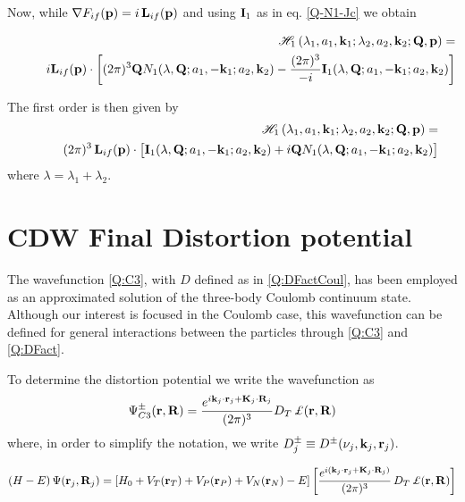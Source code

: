   \noindent
Now, while $\nabla F_{if} ({\mathbf{p}}) = i \, \mathbf{L}_{if}(\mathbf{p})$ and
using $\mathbf{I}_{1}$ as in eq. \ref{Q-N1-Jc} we obtain

\begin{eqnarray*}
&&\mathcal{H}_{1}\left( \lambda_{1},a_{1},\vect{k}_{1} ; \lambda_{2},
a_{2}, \vect{k}_{2}; \vect{Q}, \vect{p} \right)= \\
&&\qquad i \vect{L}_{if} ({\vect{p}})
\cdot \left[(2 \pi)^{3} \vect{Q} N_{1}(\lambda,\vect{Q} ; a_{1},-\vect{k}_{1}
; a_{2},\vect{k}_{2}) - \frac{(2 \pi)^{3}}{-i}
\vect{I}_{1}(\lambda,\vect{Q}; a_{1},-\vect{k}_{1}; a_{2},\vect{k}_{2} )
\vstretch \right]
\end{eqnarray*}

The first order is then given by
\begin{eqnarray}\label{Q:mathc-lambd-a_1}
&&\mathcal{H}_{1}\left( \lambda_{1},a_{1},\vect{k}_{1} ; \lambda_{2},
a_{2}, \vect{k}_{2}; \vect{Q}, \vect{p} \right)= \\
&& \qquad (2 \pi)^{3} \, \vect{L}_{if}
({\vect{p}}) \cdot  \left[ \vect{I}_{1}(\lambda,\vect{Q}; a_{1},-\vect{k}_{1};
a_{2},\vect{k}_{2} ) + i \vect{Q} N_{1}(\lambda,\vect{Q} ;
a_{1},-\vect{k}_{1} ; a_{2},\vect{k}_{2}) \vstretch \right] \nonumber
\end{eqnarray}
%
where $\lambda = \lambda_{1}+\lambda_{2}$.



\section{CDW Final Distortion potential}
The wavefunction \ref{Q:C3}, with $D$ defined as in \ref{Q:DFactCoul},
has been employed as an approximated solution of the three-body Coulomb
continuum state. Although our interest is focused in the Coulomb case,
this wavefunction can be defined for general interactions between the
particles through \ref{Q:C3} and \ref{Q:DFact}.

To determine the distortion potential we write the wavefunction as
\[
\Psi^{\pm}_{C3} (\vect{r},\vect{R}) = \frac{e^{i \vect{k}_j\cdot
\vect{r}_j+\vect{K}_j\cdot \vect{R}_j}}{(2 \pi)^3} D_{T} \,
\pounds(\vect{r},\vect{R})
\]
where, in order to simplify the notation, we write $D^{\pm}_{j} \equiv
D^{\pm}(\nu_j,\mathbf{k}_{j},\mathbf{r}_{j})$.

\begin{equation}\label{Q:C3-final-disto}
\left( H - E \right) \Psi(\vect{r}_{j}, \vect{R}_{j}) = \left[ H_{0} +
V_{T}(\vect{r}_{T}) + V_{P}(\vect{r}_{P}) + V_{N}(\vect{r}_{N}) - E \right]
\left[ \frac{e^{i (\vect{k}_j\cdot \vect{r}_j+\vect{K}_j \cdot
\vect{R}_j)}}{(2 \pi)^3} \, D_{T} \, \pounds(\vect{r},\vect{R}) \right]
\end{equation}

